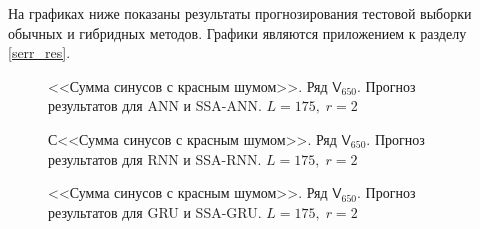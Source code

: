 \documentclass[specialist,
               substylefile = spbu.rtx,
               subf,href,colorlinks=true, 12p]{disser}
\begin{document}
На графиках ниже показаны результаты прогнозирования тестовой выборки обычных и гибридных методов. Графики являются приложением к разделу \ref{serr_res}.

\begin{figure}[H]
	\captionsetup{justification=centering}
	\caption{<<Сумма синусов с красным шумом>>. Ряд $\mathsf{V}_{650}$. Прогноз результатов для ANN и SSA-ANN. $L = 175, \; r = 2$}
\end{figure}

\begin{figure}[H]
	\captionsetup{justification=centering}
	\caption{С<<Сумма синусов с красным шумом>>. Ряд $\mathsf{V}_{650}$. Прогноз результатов для RNN и SSA-RNN. $L = 175, \; r = 2$}
\end{figure}

\begin{figure}[H]
	\captionsetup{justification=centering}
	\caption{<<Сумма синусов с красным шумом>>. Ряд $\mathsf{V}_{650}$. Прогноз результатов для GRU и SSA-GRU. $L = 175, \; r = 2$}
	\label{serr_r2_res_gru}
\end{figure}
\end{document}
